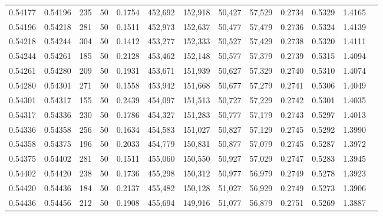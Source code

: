\begin{tabular}{rrrrrrrrrrrrr}
0.54177 & 0.54196 &   235 &  50 &                                     0.1754 & 452,692 & 152,918 &  50,427 &  57,529 & 0.2734 & 0.5329 & 1.4165 \\
0.54196 & 0.54218 &   281 &  50 &                                     0.1511 & 452,973 & 152,637 &  50,477 &  57,479 & 0.2736 & 0.5324 & 1.4139 \\
0.54218 & 0.54244 &   304 &  50 &                                     0.1412 & 453,277 & 152,333 &  50,527 &  57,429 & 0.2738 & 0.5320 & 1.4111 \\
0.54244 & 0.54261 &   185 &  50 &                                     0.2128 & 453,462 & 152,148 &  50,577 &  57,379 & 0.2739 & 0.5315 & 1.4094 \\
0.54261 & 0.54280 &   209 &  50 &                                     0.1931 & 453,671 & 151,939 &  50,627 &  57,329 & 0.2740 & 0.5310 & 1.4074 \\
0.54280 & 0.54301 &   271 &  50 &                                     0.1558 & 453,942 & 151,668 &  50,677 &  57,279 & 0.2741 & 0.5306 & 1.4049 \\
0.54301 & 0.54317 &   155 &  50 &                                     0.2439 & 454,097 & 151,513 &  50,727 &  57,229 & 0.2742 & 0.5301 & 1.4035 \\
0.54317 & 0.54336 &   230 &  50 &                                     0.1786 & 454,327 & 151,283 &  50,777 &  57,179 & 0.2743 & 0.5297 & 1.4013 \\
0.54336 & 0.54358 &   256 &  50 &                                     0.1634 & 454,583 & 151,027 &  50,827 &  57,129 & 0.2745 & 0.5292 & 1.3990 \\
0.54358 & 0.54375 &   196 &  50 &                                     0.2033 & 454,779 & 150,831 &  50,877 &  57,079 & 0.2745 & 0.5287 & 1.3972 \\
0.54375 & 0.54402 &   281 &  50 &                                     0.1511 & 455,060 & 150,550 &  50,927 &  57,029 & 0.2747 & 0.5283 & 1.3945 \\
0.54402 & 0.54420 &   238 &  50 &                                     0.1736 & 455,298 & 150,312 &  50,977 &  56,979 & 0.2749 & 0.5278 & 1.3923 \\
0.54420 & 0.54436 &   184 &  50 &                                     0.2137 & 455,482 & 150,128 &  51,027 &  56,929 & 0.2749 & 0.5273 & 1.3906 \\
0.54436 & 0.54456 &   212 &  50 &                                     0.1908 & 455,694 & 149,916 &  51,077 &  56,879 & 0.2751 & 0.5269 & 1.3887 \\

\end{tabular}
